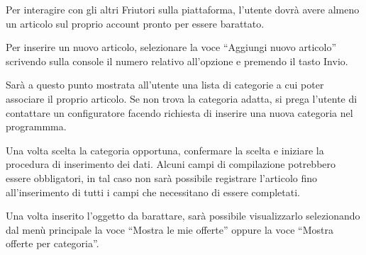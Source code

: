 Per interagire con gli altri Friutori sulla piattaforma, l'utente dovrà avere almeno un articolo sul proprio account pronto per essere barattato.

Per inserire un nuovo articolo, selezionare la voce ``Aggiungi nuovo articolo'' scrivendo sulla console il numero relativo all'opzione e premendo il tasto Invio.

Sarà a questo punto mostrata all'utente una lista di categorie a cui poter associare il proprio articolo. Se non trova la categoria adatta, si prega l'utente di contattare un configuratore facendo richiesta di inserire una nuova categoria nel programmma.

Una volta scelta la categoria opportuna, confermare la scelta e iniziare la procedura di inserimento dei dati. Alcuni campi di compilazione potrebbero essere obbligatori, in tal caso non sarà possibile registrare l'articolo fino all'inserimento di tutti i campi che necessitano di essere completati.

Una volta inserito l'oggetto da barattare, sarà possibile visualizzarlo selezionando dal menù principale la voce ``Mostra le mie offerte'' oppure la voce ``Mostra offerte per categoria''.

